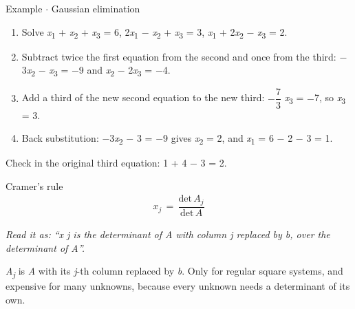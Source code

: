 \documentclass[11pt]{article}
\begin{document}
\begin{keepsection}
\begin{workedbox}{Example \ensuremath{\cdot} Gaussian elimination}
\begin{enumerate}
\item Solve \textit{x}\textsubscript{1} + \textit{x}\textsubscript{2} + \textit{x}\textsubscript{3} = 6, 2\textit{x}\textsubscript{1} \ensuremath{-} \textit{x}\textsubscript{2} + \textit{x}\textsubscript{3} = 3, \textit{x}\textsubscript{1} + 2\textit{x}\textsubscript{2} \ensuremath{-} \textit{x}\textsubscript{3} = 2.
\item Subtract twice the first equation from the second and once from the third: \ensuremath{-}3\textit{x}\textsubscript{2} \ensuremath{-} \textit{x}\textsubscript{3} = \ensuremath{-}9 and \textit{x}\textsubscript{2} \ensuremath{-} 2\textit{x}\textsubscript{3} = \ensuremath{-}4.
\item Add a third of the new second equation to the new third: \ensuremath{-}{\small\ensuremath{\dfrac{7}{3}}} \textit{x}\textsubscript{3} = \ensuremath{-}7, so \textit{x}\textsubscript{3} = 3.
\item Back substitution: \ensuremath{-}3\textit{x}\textsubscript{2} \ensuremath{-} 3 = \ensuremath{-}9 gives \textit{x}\textsubscript{2} = 2, and \textit{x}\textsubscript{1} = 6 \ensuremath{-} 2 \ensuremath{-} 3 = 1.
\end{enumerate}

Check in the original third equation: 1 + 4 \ensuremath{-} 3 = 2.
\end{workedbox}

\begin{equationcard}{Cramer's rule}
\[ \begin{gathered} {x}_{{j}}\, =\, \dfrac{\text{det}\, {A}_{{j}}}{\text{det}\, {A}} \end{gathered} \]
{\small \emph{Read it as: “x j is the determinant of A with column j replaced by b, over the determinant of A”.}\par \textit{A}\textsubscript{\textit{j}} is \textit{A} with its \textit{j}-th column replaced by \textit{b}. Only for regular square systems, and expensive for many unknowns, because every unknown needs a determinant of its own.}
\end{equationcard}


\end{keepsection}
\end{document}
